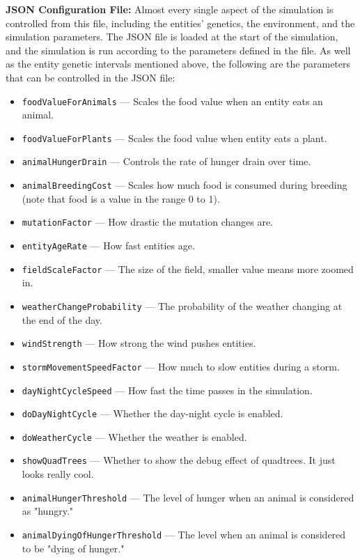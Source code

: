 \documentclass[10pt, a4paper]{scrartcl}
\begin{document}
\begin{multicols}{2}
    \noindent \textbf{JSON Configuration File: } Almost every single aspect of the simulation is controlled from this file,
    including the entities' genetics, the environment, and the simulation parameters. The JSON file is loaded at the start
    of the simulation, and the simulation is run according to the parameters defined in the file. As well as the entity
    genetic intervals mentioned above, the following are the parameters that can be controlled in the JSON file:
    \begin{itemize}
      \item \verb|foodValueForAnimals| — Scales the food value when an entity eats an animal.
      \item \verb|foodValueForPlants| — Scales the food value when entity eats a plant.
      \item \verb|animalHungerDrain| — Controls the rate of hunger drain over time.
      \item \verb|animalBreedingCost| — Scales how much food is consumed during breeding (note that food is a value
      in the range 0 to 1).
      \item \verb|mutationFactor| — How drastic the mutation changes are.
      \item \verb|entityAgeRate| — How fast entities age.
      \item \verb|fieldScaleFactor| — The size of the field, smaller value means more zoomed in.
      \item \verb|weatherChangeProbability| — The probability of the weather changing at the end of the day.
      \item \verb|windStrength| — How strong the wind pushes entities.
      \item \verb|stormMovementSpeedFactor| — How much to slow entities during a storm.
      \item \verb|dayNightCycleSpeed| — How fast the time passes in the simulation.
      \item \verb|doDayNightCycle| — Whether the day-night cycle is enabled.
      \item \verb|doWeatherCycle| — Whether the weather is enabled.
      \item \verb|showQuadTrees| — Whether to show the debug effect of quadtrees. It just looks really cool.
      \item \verb|animalHungerThreshold| — The level of hunger when an animal is considered as "hungry."
      \item \verb|animalDyingOfHungerThreshold| — The level when an animal is considered to be "dying of hunger."
    \end{itemize}


\end{multicols}
\end{document}
